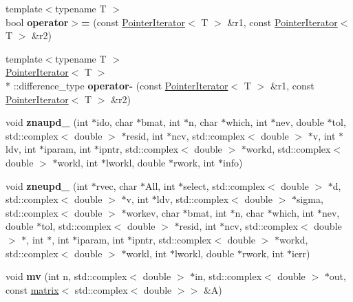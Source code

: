 \begin{DoxyCompactItemize}
\item 
\hypertarget{namespacekeycpp_af6e928cddf953cbdd90b0cd6f3802b24}{{\footnotesize template$<$typename T $>$ }\\bool {\bfseries operator$>$=} (const \hyperlink{classkeycpp_1_1_pointer_iterator}{Pointer\-Iterator}$<$ T $>$ \&r1, const \hyperlink{classkeycpp_1_1_pointer_iterator}{Pointer\-Iterator}$<$ T $>$ \&r2)}\label{namespacekeycpp_af6e928cddf953cbdd90b0cd6f3802b24}

\item 
\hypertarget{namespacekeycpp_ad88546738baf0a658bbe540827343939}{{\footnotesize template$<$typename T $>$ }\\\hyperlink{classkeycpp_1_1_pointer_iterator}{Pointer\-Iterator}$<$ T $>$\\*
\-::difference\-\_\-type {\bfseries operator-\/} (const \hyperlink{classkeycpp_1_1_pointer_iterator}{Pointer\-Iterator}$<$ T $>$ \&r1, const \hyperlink{classkeycpp_1_1_pointer_iterator}{Pointer\-Iterator}$<$ T $>$ \&r2)}\label{namespacekeycpp_ad88546738baf0a658bbe540827343939}

\item 
\hypertarget{namespacekeycpp_a9f7b4d3036445526caa713d8c224a9a3}{void {\bfseries znaupd\-\_\-} (int $\ast$ido, char $\ast$bmat, int $\ast$n, char $\ast$which, int $\ast$nev, double $\ast$tol, std\-::complex$<$ double $>$ $\ast$resid, int $\ast$ncv, std\-::complex$<$ double $>$ $\ast$v, int $\ast$ldv, int $\ast$iparam, int $\ast$ipntr, std\-::complex$<$ double $>$ $\ast$workd, std\-::complex$<$ double $>$ $\ast$workl, int $\ast$lworkl, double $\ast$rwork, int $\ast$info)}\label{namespacekeycpp_a9f7b4d3036445526caa713d8c224a9a3}

\item 
\hypertarget{namespacekeycpp_af1b4572567168166e84ec6ed3eae0191}{void {\bfseries zneupd\-\_\-} (int $\ast$rvec, char $\ast$All, int $\ast$select, std\-::complex$<$ double $>$ $\ast$d, std\-::complex$<$ double $>$ $\ast$v, int $\ast$ldv, std\-::complex$<$ double $>$ $\ast$sigma, std\-::complex$<$ double $>$ $\ast$workev, char $\ast$bmat, int $\ast$n, char $\ast$which, int $\ast$nev, double $\ast$tol, std\-::complex$<$ double $>$ $\ast$resid, int $\ast$ncv, std\-::complex$<$ double $>$ $\ast$, int $\ast$, int $\ast$iparam, int $\ast$ipntr, std\-::complex$<$ double $>$ $\ast$workd, std\-::complex$<$ double $>$ $\ast$workl, int $\ast$lworkl, double $\ast$rwork, int $\ast$ierr)}\label{namespacekeycpp_af1b4572567168166e84ec6ed3eae0191}

\item 
\hypertarget{namespacekeycpp_a5794468c104a7539534c626147ae057f}{void {\bfseries mv} (int n, std\-::complex$<$ double $>$ $\ast$in, std\-::complex$<$ double $>$ $\ast$out, const \hyperlink{classkeycpp_1_1matrix}{matrix}$<$ std\-::complex$<$ double $>$$>$ \&A)}\label{namespacekeycpp_a5794468c104a7539534c626147ae057f}


\end{DoxyCompactItemize}
